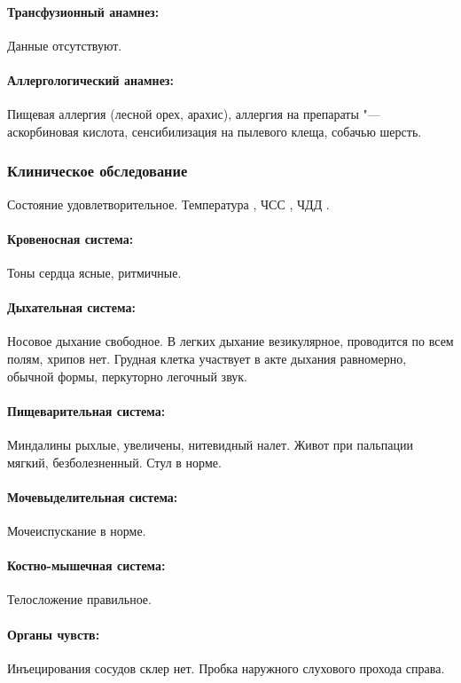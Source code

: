 \documentclass[a4paper,14pt]{extarticle}
\newcommand{\oCelsius}{\tcdegree{}C}
\newcommand{\bpm}{уд/мин}
\newcommand{\mpm}{/мин}
\begin{document}
\paragraph{Трансфузионный анамнез:} Данные отсутствуют.

\paragraph{Аллергологический анамнез:} Пищевая аллергия (лесной орех, арахис), аллергия на препараты "--- аскорбиновая кислота, сенсибилизация на пылевого клеща, собачью шерсть.

\subsubsection*{Клиническое обследование}

Состояние удовлетворительное. Температура \numprint[\oCelsius]{36.6}, ЧСС \numprint[\bpm]{95}, ЧДД \numprint[\mpm]{23}.

\paragraph{Кровеносная система:} Тоны сердца ясные, ритмичные.

\paragraph{Дыхательная система:} Носовое дыхание свободное. В легких дыхание везикулярное, проводится по всем полям, хрипов нет. Грудная клетка участвует в акте дыхания равномерно, обычной формы, перкуторно легочный звук.

\paragraph{Пищеварительная система:} Миндалины рыхлые, увеличены, нитевидный налет. Живот при пальпации мягкий, безболезненный. Стул в норме.

\paragraph{Мочевыделительная система:} Мочеиспускание в норме.

\paragraph{Костно-мышечная система:} Телосложение правильное.

\paragraph{Органы чувств:} Инъецирования сосудов склер нет. Пробка наружного слухового прохода справа.
\end{document}
